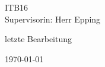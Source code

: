 \vspace{15mm}
\begin{center}
    {\color{white}\LARGE{\textbf{\vspace{30mm}} \colorbox{BurntOrange}{ITB16}\\\vspace{5mm}\colorbox{BurntOrange}{Supervisorin: Herr Epping}}}
\end{center}



\color{white}\centering\large\colorbox{BurntOrange}{letzte Bearbeitung}

\color{white}\centering\large\colorbox{BurntOrange}{\today\hspace{0.2cm}\currenttime}

